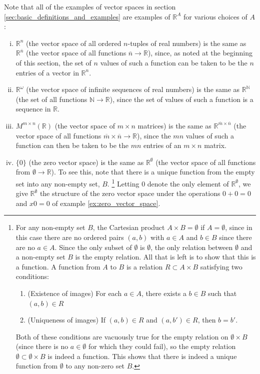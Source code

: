 \documentclass[12pt,letterpaper,reqno]{article}
\numberwithin{equation}{section}
\begin{document}
Note that all of the examples of vector spaces in section \ref{sec:basic_definitions_and_examples} are examples of $\mathbb{R}^A$ for various choices of $A$:

\begin{enumerate}[(i)]
	\item $\mathbb{R}^n$ (the vector space of all ordered $n$-tuples of real numbers) is the same as $\mathbb{R}^{\overline{n}}$ (the vector space of all functions $\overline{n} \to \mathbb{R}$), since, as noted at the beginning of this section, the set of $n$ values of such a function can be taken to be the $n$ entries of a vector in $\mathbb{R}^n$.
	\item $\mathbb{R}^\omega$ (the vector space of infinite sequences of real numbers) is the same as $\mathbb{R}^{\mathbb{N}}$ (the set of all functions $\mathbb{N} \to \mathbb{R}$), since the set of values of such a function is a sequence in $\mathbb{R}$.
	\item $M^{m \times n}(\mathbb{R})$ (the vector space of $m \times n$ matrices) is the same as $\mathbb{R}^{\overline{m} \times \overline{n}}$ (the vector space of all functions $\overline{m} \times \overline{n} \to \mathbb{R}$), since the $mn$ values of such a function can then be taken to be the $mn$ entries of an $m \times n$ matrix.
	\item $\{0\}$ (the zero vector space) is the same as $\mathbb{R}^\emptyset$ (the vector space of all functions from $\emptyset \to \mathbb{R}$). To see this, note that there is a unique function from the empty set into any non-empty set, $B$.  \footnote{For any non-empty set $B$, the Cartesian product $A \times B=\emptyset$ if $A=\emptyset$, since in this case there are no ordered pairs $(a,b)$ with $a \in A$ and $b \in B$ since there are no $a \in A$. Since the only subset of $\emptyset$ is $\emptyset$, the only relation between $\emptyset$ and a non-empty set $B$ is the empty relation. All that is left is to show that this is a function. A function from $A$ to $B$ is a relation $R \subset A \times B$ satisfying two conditions:
\begin{enumerate}[(1)]
	\item (Existence of images) For each $a \in A$, there exists a $b \in B$ such that $(a,b) \in R$
	\item (Uniqueness of images) If $(a,b) \in R$ and $(a,b') \in R$, then $b=b'$. 
\end{enumerate}
Both of these conditions are vacuously true for the empty relation on $\emptyset \times B$ (since there is no $a \in \emptyset$ for which they could fail), so the empty relation $\emptyset \subset \emptyset \times B$ is indeed a function. This shows that there is indeed a unique function from $\emptyset$ to any non-zero set $B$.} Letting $0$ denote the only element of $\mathbb{R}^{\emptyset}$, we give $\mathbb{R}^{\emptyset}$ the structure of the zero vector space under the operations $0+0=0$ and $x0=0$ of example \ref{ex:zero_vector_space}. 
\end{enumerate}
\end{document}
